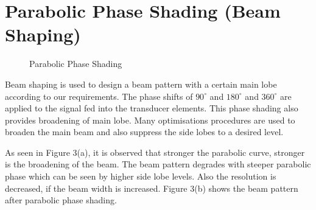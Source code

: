 \section{ Parabolic Phase Shading (Beam Shaping) } \label{ Parabolic Phase Shading (Beam Shaping) } 

\begin{figure}[h]
\centering
{}
\caption{ Parabolic Phase Shading }
\end{figure}

\noindent Beam shaping is used to design a beam pattern with a certain main lobe according to our requirements. The phase shifts of $90^{\circ}$ and $180^{\circ}$ and $360^{\circ}$ are applied to the signal fed into the transducer elements. This phase shading also provides broadening of main lobe. Many optimisations procedures are used to broaden the main beam and also suppress the side lobes to a desired level.

\noindent  As seen in Figure 3(a), it is observed that stronger the parabolic curve, stronger is the broadening of the beam. The beam pattern degrades with steeper parabolic phase which can be seen by higher side lobe levels. Also the resolution is decreased, if the beam width is increased. Figure 3(b) shows the beam pattern after parabolic phase shading.

